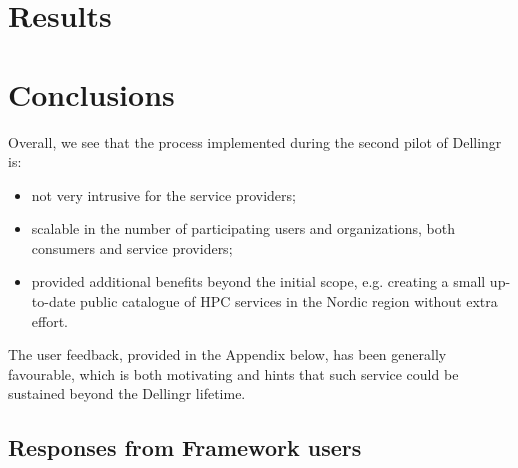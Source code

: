 \documentclass{article}
\begin{document}
\section{Results}
\label{sec:results}


\section{Conclusions}

Overall, we see that the process implemented during the second pilot of Dellingr is:
\begin{itemize}
\item not very intrusive for the service providers;
\item scalable in the number of participating users and organizations, both consumers and service providers;
\item provided additional benefits beyond the initial scope, e.g. creating a small up-to-date public catalogue of HPC services in the Nordic region without extra effort.
\end{itemize} 

The user feedback, provided in the Appendix below, has been generally favourable, which is both motivating and hints that such service could be sustained beyond the Dellingr lifetime.

\newpage
{}


\begin{appendices}

\section{Responses from Framework users}
\label{app:answers}

% 
\end{appendices}
\end{document}
